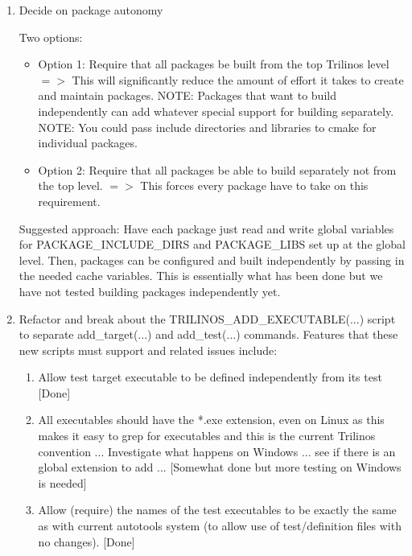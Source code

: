 \begin{enumerate}

{}\item Decide on package autonomy

Two options:

  \begin{itemize}

  {}\item Option 1: Require that all packages be built from the top
  Trilinos level $=>$ This will significantly reduce the amount of
  effort it takes to create and maintain packages.  NOTE: Packages
  that want to build independently can add whatever special support for
  building separately.  NOTE: You could pass include directories and
  libraries to cmake for individual packages.

  {}\item Option 2: Require that all packages be able to build
  separately not from the top level. $=>$ This forces every package
  have to take on this requirement.

  \end{itemize}

Suggested approach: Have each package just read and write global
variables for PACKAGE\_INCLUDE\_DIRS and PACKAGE\_LIBS set up at the
global level.  Then, packages can be configured and built
independently by passing in the needed cache variables.  This is
essentially what has been done but we have not tested building
packages independently yet.

{}\item Refactor and break about the TRILINOS\_ADD\_EXECUTABLE(...) 
script to separate add\_target(...) and add\_test(...) commands.
Features that these new scripts must support and related issues
include:

  \begin{enumerate}

  {}\item Allow test target executable to be defined independently
  from its test [Done]

  {}\item All executables should have the *.exe extension, even on
  Linux as this makes it easy to grep for executables and this is the
  current Trilinos convention ... Investigate what happens on Windows
  ... see if there is an global extension to add ... [Somewhat done
  but more testing on Windows is needed]

  {}\item Allow (require) the names of the test executables to be
  exactly the same as with current autotools system (to allow use of
  test/definition files with no changes). [Done]


\end{enumerate}
\end{enumerate}
